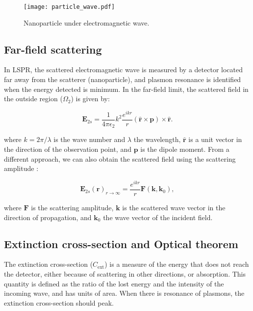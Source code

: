 \begin{figure}[h] %
   \centering
   \texttt{[image: particle\_wave.pdf]} 
   \caption{Nanoparticle under electromagnetic wave.}
   \label{fig:part_wave}
\end{figure}

\subsection{Far-field scattering} \label{sec:ff_scattering}

In LSPR, the scattered electromagnetic wave is measured by a detector located far away 
from the scatterer (nanoparticle), and plasmon resonance is identified when the energy 
detected is minimum. In the far-field limit, the scattered field
in the outside region ($\Omega_2$) is given by: 

\begin{equation} \label{eq:scat_efield_long_range}
    \mathbf{E}_{2s} = \frac{1}{4\pi\epsilon_2}k^2\frac{e^{ikr}}{r} (\mathbf{\hat{r}} \times \mathbf{p})\times\mathbf{\hat{r}}.
\end{equation} 

\noindent where $k=2\pi/\lambda$ is the wave number and $\lambda$ the wavelength, $\mathbf{\hat{r}}$ 
is a unit vector in the direction of the observation point, and $\mathbf{p}$ is
the dipole moment.
From a different approach, we can also obtain the scattered field using the 
scattering amplitude \cite{Jackson}:

\begin{equation} \label{eq:scat_efield_fwa}
    \mathbf{E}_{2s}(\mathbf{r})_{r\to\infty} = \frac{e^{ikr}}{r} \mathbf{F}(\mathbf{k},\mathbf{k}_0),
\end{equation}

\noindent where $\mathbf{F}$ is the scattering amplitude, $\mathbf{k}$ is the 
scattered wave vector in the direction of propagation, and $\mathbf{k}_0$ the 
wave vector of the incident field. 

\subsection{Extinction cross-section and Optical theorem} \label{sec:cext_ot}

The extinction cross-section ($C_\text{ext}$) is a measure of the energy that 
does not reach the detector, either because of scattering in other directions,
or absorption. This quantity is defined as the ratio of the lost energy and 
the intensity of the incoming wave, and has units of area. When there is 
resonance of plasmons, the extinction cross-section should peak.


